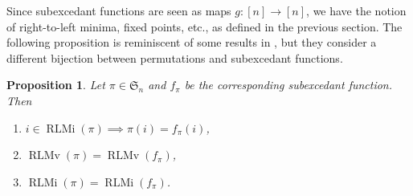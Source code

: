 \documentclass[reqno]{amsart}
\newtheorem{proposition}[theorem]{Proposition}
\theoremstyle{definition}
\newcommand{\symS}{\mathfrak{S}}
\DeclareMathOperator{\RLMv}{RLMv}
\DeclareMathOperator{\RLMi}{RLMi}
\begin{document}
Since subexcedant functions are seen as maps $g:[n] \to [n]$,
we have the notion of right-to-left minima, fixed points, etc., as defined in the previous section.
%
The following proposition is reminiscent of some results in \cite{BarilVajnovszki2017},
but they consider a different bijection between permutations and subexcedant functions.
%
\begin{proposition}\label{prop:rlmForSEF}
Let $\pi\in\symS_n$ and $f_{\pi}$ be the corresponding subexcedant function. 
Then
\begin{enumerate}[label=(\alph*)]
    \item $i \in \RLMi(\pi)\implies\pi(i)=f_{\pi}(i)$,
    \item $\RLMv(\pi) = \RLMv(f_{\pi})$,
    \item $\RLMi(\pi) = \RLMi(f_{\pi})$.
\end{enumerate}
\end{proposition}
\end{document}
